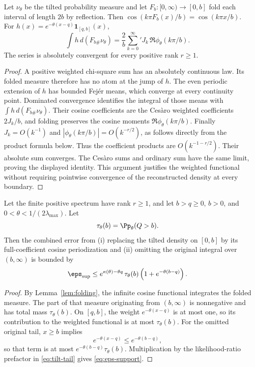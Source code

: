\begin{lemma}
\label{lem:folding}
Let \(\nu_\theta\) be the tilted probability measure and let
\(F_b:[0,\infty)\to[0,b]\) fold each interval of length \(2b\) by
reflection.  Then
\(\cos(k\pi F_b(x)/b)=\cos(k\pi x/b)\).
For \(h(x)=e^{-\theta(x-q)}\mathbf1_{[q,b]}(x)\),
\[
\int h\,d(F_{b\#}\nu_\theta)
=\frac2b\sum_{k=0}^{\infty}{}'
J_k\,\Re\phi_\theta(k\pi/b).
\]
The series is absolutely convergent for every positive rank \(r\ge1\).
\end{lemma}
\begin{proof}
A positive weighted chi-square sum has an absolutely continuous law. Its
folded measure therefore has no atom at the jump of \(h\).  The even periodic
extension of \(h\) has bounded Fej\'er means, which converge at every continuity
point.  Dominated convergence identifies the integral of those means with
\(\int h\,d(F_{b\#}\nu_\theta)\).  Their cosine coefficients are the Ces\`aro
weighted coefficients \(2J_k/b\), and folding preserves the cosine moments
\(\Re\phi_\theta(k\pi/b)\).  Finally
\(J_k=O(k^{-1})\) and
\(|\phi_\theta(k\pi/b)|=O(k^{-r/2})\), as follows directly from the product
formula below.  Thus the coefficient products are
\(O(k^{-1-r/2})\). Their absolute sum converges.  The Ces\`aro sums and ordinary
sum have the same limit, proving the displayed identity.  This argument
justifies the weighted functional without requiring pointwise convergence of
the reconstructed density at every boundary.
\end{proof}

\begin{proposition}
\label{prop:support}
Let the finite positive spectrum have rank \(r\ge1\), and let
\(b>q\ge0\), \(b>0\), and \(0<\theta<1/(2\lambda_{\max})\).  Let
\[
\tau_{\theta}(b)=\Pp_{\theta}(Q>b).
\]
Then the combined error from (i) replacing the tilted density on $[0,b]$ by its full-coefficient cosine periodization and (ii) omitting the original integral over $(b,\infty)$ is bounded by
\begin{equation}
\eps_{\mathrm{sup}}
\le
e^{\kappa(\theta)-\theta q}\,
\tau_{\theta}(b)
\left(1+e^{-\theta(b-q)}\right).
\label{eq:eps-support}
\end{equation}
\end{proposition}

\begin{proof}
By Lemma~\ref{lem:folding}, the infinite cosine functional integrates
the folded measure.  The part of that measure originating from \((b,\infty)\)
is nonnegative and has total mass $\tau_{\theta}(b)$. On $[q,b]$, the weight $e^{-\theta(x-q)}$ is at most one, so its contribution to the weighted functional is at most $\tau_{\theta}(b)$. For the omitted original tail, $x\ge b$ implies
\[
e^{-\theta(x-q)}\le e^{-\theta(b-q)},
\]
so that term is at most $e^{-\theta(b-q)}\tau_{\theta}(b)$. Multiplication by the likelihood-ratio prefactor in \eqref{eq:tilt-tail} gives \eqref{eq:eps-support}.
\end{proof}

